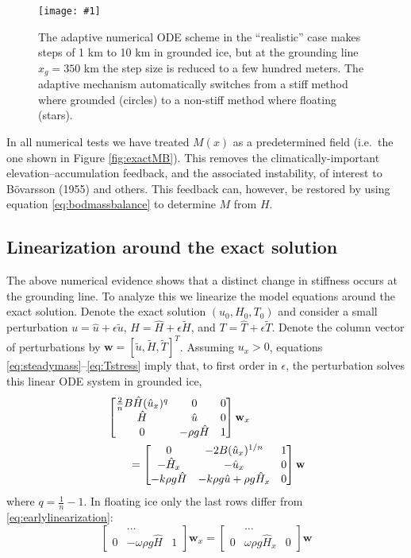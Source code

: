 \documentclass[twocolumn]{igs}
\renewcommand{\dh}{\fontencoding{T1}\selectfont{\symbol{240}}}
\newcommand{\onecol}[1]{\texttt{[image: \#1]}}
\newcommand{\citebod}{B\"o\dh varsson (1955)\nocite{Bodvardsson}\xspace}
\newcommand{\bw}{\mathbf{w}}
\newcommand{\hu}{\hat u}
\newcommand{\hH}{\hat H}
\newcommand{\hT}{\hat T}
\newcommand{\tu}{\tilde u}
\newcommand{\tH}{\tilde H}
\newcommand{\tT}{\tilde T}
\newcommand{\eps}{\epsilon}
\begin{document}
\begin{figure}[ht]
\onecol{em-dt-adaptive}
\caption{The adaptive numerical ODE scheme in the ``realistic'' case makes steps of 1 km to 10 km in grounded ice, but at the grounding line $x_g=350$ km the step size is reduced to a few hundred meters.  The adaptive mechanism automatically switches from a stiff method where grounded (circles) to a non-stiff method where floating (stars).} \label{fig:shoot-dt-adaptive}
\end{figure}

In all numerical tests we have treated $M(x)$ as a predetermined field (i.e.~the one shown in Figure \ref{fig:exactMB}).  This removes the climatically-important elevation--accumulation feedback, and the associated instability, of interest to \citebod and others.  This feedback can, however, be restored by using equation \eqref{eq:bodmassbalance} to determine $M$ from $H$.


\subsection*{Linearization around the exact solution}  The above numerical evidence shows that a distinct change in stiffness occurs at the grounding line.  To analyze this we linearize the model equations around the exact solution.  Denote the exact solution $(u_0,H_0,T_0)$ and consider a small perturbation $u = \hu + \eps \tu$, $H = \hH + \eps \tH$, and $T = \hT + \eps \tT$.  Denote the column vector of perturbations by $\bw = [\tu, \tH, \tT]^T$.  Assuming $u_x > 0$, equations \eqref{eq:steadymass}--\eqref{eq:Tstress} imply that, to first order in $\eps$, the perturbation solves this linear ODE system in grounded ice,
\begin{align}
&\begin{bmatrix}
\frac{2}{n} B \hH (\hu_x)^q & 0 & 0 \\
\hH & \hu & 0 \\
0 & -\rho g \hH & 1
\end{bmatrix}
\bw_x \notag \\
&\qquad =
\begin{bmatrix}
0 & - 2 B (\hu_x)^{1/n} & 1 \\
- \hH_x & - \hu_x & 0 \\
-k \rho g \hH & - k \rho g \hu + \rho g \hH_x & 0
\end{bmatrix}
\bw  \label{eq:earlylinearization}
\end{align}
where $q = \frac{1}{n} - 1$.  In floating ice only the last rows differ from \eqref{eq:earlylinearization}:
\begin{equation}
\begin{bmatrix}
 & \dots & \\
0 & - \omega \rho g \hH & 1
\end{bmatrix}
\bw_x
=
\begin{bmatrix}
 & \dots & \\
0 & \omega \rho g \hH_x & 0
\end{bmatrix}
\bw
\label{eq:floatinglinearization}
\end{equation}
\end{document}

